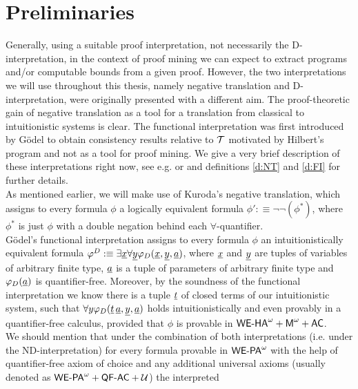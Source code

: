 \section{
  Preliminaries
} \label{s:si}

\newcommand{\typeOfXZ}{0(10)(1)}

 Generally, using a suitable proof interpretation, 
not necessarily the D-interpretation, 
 in the context of proof mining we can expect to extract 
programs and/or computable bounds 
from a given proof. However, the two interpretations we will use throughout this thesis, 
namely negative translation 
 and D-interpretation, were originally
presented with a different aim. The proof-theoretic gain of negative 
translation as a tool for a translation
from classical to intuitionistic systems is clear. The functional 
interpretation was first introduced
by G\"odel to obtain consistency results relative to $\mathcal{T}$ motivated by Hilbert's program and not
as a tool for proof mining. We give a 
very brief description of these interpretations right now,  see
e.g. \cite{Kohlenbach08} or \cite{AF98} and definitions \ref{d:NT} and 
\ref{d:FI} for further details.\\
%
As mentioned earlier, we will make use of Kuroda's negative translation, 
which assigns to every formula $\phi$ a 
logically equivalent formula $\phi':\equiv\neg\neg (\phi^*)$, where $\phi^*$ is just $\phi$ 
with a double negation behind each $\forall$-quantifier.\\
%
G\"odel's functional interpretation assigns to every formula $\phi$ an intuitionistically 
equivalent formula $\varphi^D:\equiv\exists\underline x\forall\underline y \varphi_D(\underline x,\underline y,\underline a)$,
where $\underline x$ and $\underline y$ are tuples of variables of arbitrary finite type, $\underline a$ is 
a tuple of parameters of arbitrary finite type and $\varphi_D(\underline a)$ is quantifier-free. 
Moreover, by the soundness of
the functional interpretation we know there is a tuple $\underline t$ 
of closed terms of our intuitionistic system, such that 
$\forall y \varphi_D(\underline t\,\underline a,\underline y,\underline a)$ holds intuitionistically and 
even provably in a quantifier-free calculus, provided
that $\phi$ is provable in ${\textsf{\upshape WE-HA}}^{\omega}+\textsf{\upshape M}^\omega+\textsf{\upshape AC}$.\\
We should mention 
that under the combination of both interpretations 
(i.e. under the ND-interpretation) for every formula provable in ${\textsf{\upshape WE-PA}}^{\omega}$
with the help of quantifier-free axiom of choice and any additional universal 
axioms (usually denoted as ${\textsf{\upshape WE-PA}}^{\omega} + \textsf{\upshape QF-}\textsf{\upshape AC} + \mathcal{U}$) the interpreted 

